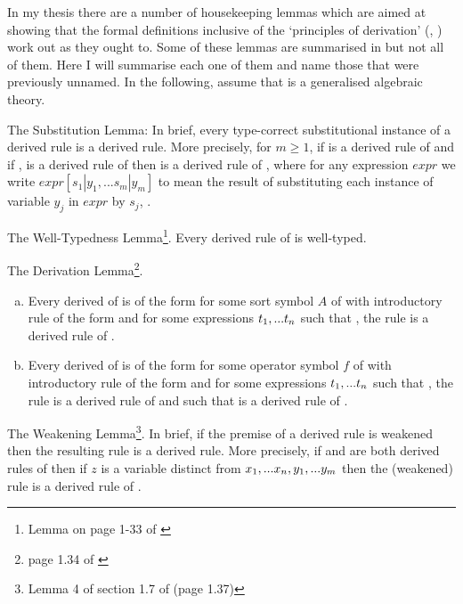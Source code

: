 \note In my thesis there are a number of housekeeping lemmas which are aimed at showing that the formal definitions inclusive of the `principles of derivation' (\cite{Cartmell78}, \cite{Cartmell86}) work out as they ought to. Some of these lemmas are summarised in \cite{Cartmell86} but not all of them. Here I will summarise each one of them and name those that were previously unnamed. In the following, assume that \gatUw is a generalised algebraic theory.

\note The Substitution Lemma: In brief, every type-correct substitutional instance of a derived rule is a derived rule. More precisely, for $m \geq 1$, if  is a derived rule of \gatUw 
and if  \foreachj,  is a derived rule of \gatUw
then  is a derived rule of \gatU, where
for any expression $expr$ we write
$expr[s_1|y_1,...s_m|y_m]$ to mean
the result of substituting each instance of variable $y_j$ in $expr$ by $s_j$, \foreachj.

\note The Well-Typedness Lemma\footnote{Lemma on page 1-33 of \cite{Cartmell78}}. Every derived rule of \gatUw is well-typed. 

\note The Derivation Lemma\footnote{page 1.34 of \cite{Cartmell78}}. 
\begin{enumerate}[(a)]

\item Every derived \Trule of \gatUw is of the form
 for some sort symbol $A$ of \gatUw with introductory rule of the form
 and for some expressions $t_1,...t_n$ such that \foreachi, the rule
 is a derived rule of \gatU.

\item Every derived \trule of \gatUw is of the form
 for some operator symbol $f$ of \gatUw 
with introductory rule of the form
and for some expressions $t_1,...t_n$ such that \foreachi, the rule
 is a derived rule of \gatUw
and such that
 is a derived rule of \gatU.
\end{enumerate}

\note The Weakening Lemma\footnote{Lemma 4 of section 1.7 of \cite{Cartmell78} (page 1.37)}. In brief, if the premise of a derived rule is weakened then the resulting rule is a derived rule. More precisely, if 
  and
 are both derived rules of \gatUw then if $z$ is a variable
distinct from $x_1,...x_n,y_1,...y_m$ then
the (weakened) rule  is a derived rule
of \gatU.

